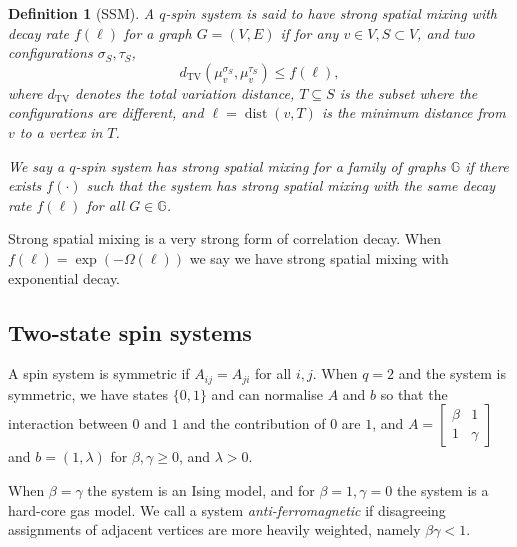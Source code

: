 \documentclass[10pt,a4paper]{article}
\newtheorem{definition}{Definition}[section]
\newcommand{\dist}{\operatorname{dist}}
\newcommand{\dTV}{d_{\mathrm{TV}}}
\begin{document}
\begin{definition}[SSM]\label{def:SSM}
A $q$-spin system is said to have strong spatial mixing with decay rate $f(\ell)$ for a graph $G=(V,E)$ if for any $v\in V, S\subset V$, and two configurations $\sigma_S,\tau_S$,
\[\dTV(\mu_v^{\sigma_S},\mu_v^{\tau_S})\leq f(\ell),\]
where $\dTV$ denotes the total variation distance, $T\subseteq S$ is the subset where the configurations are different, and $\ell=\dist(v,T)$ is the minimum distance from $v$ to a vertex in $T$.

We say a $q$-spin system has strong spatial mixing for a family of graphs $\mathbb{G}$ if there exists $f(\cdot)$ such that the system has strong spatial mixing with the same decay rate $f(\ell)$ for all $G\in\mathbb{G}$. 
\end{definition}

Strong spatial mixing is a very strong form of correlation decay. When $f(\ell)=\exp(-\Omega(\ell))$ we say we have strong spatial mixing with exponential decay. 

\subsection{Two-state spin systems}

A spin system is symmetric if $A_{ij}=A_{ji}$ for all $i,j$. %
When $q=2$ and the system is symmetric, we have states $\{0,1\}$ and can normalise $A$ and $b$ so that the interaction between $0$ and $1$ and the contribution of $0$ are $1$, and $A=
\begin{bmatrix}
\beta & 1\\
1 & \gamma
\end{bmatrix}$ and $b=(1,\lambda)$ for $\beta,\gamma\geq0$, and $\lambda>0$. 

When $\beta=\gamma$ the system is an Ising model, and for $\beta=1, \gamma=0$ the system is a hard-core gas model. We call a system \emph{anti-ferromagnetic} if disagreeing assignments of adjacent vertices are more heavily weighted, namely $\beta\gamma<1$. 
\end{document}
